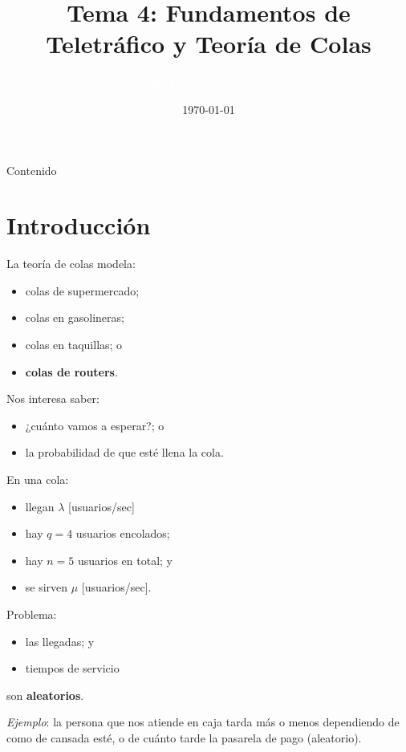 \documentclass[xcolor={x11names}]{beamer}
\title[Tema 4]{Tema 4: Fundamentos de Teletráfico y Teoría de Colas}
\author{\textcolor{white}{RSTC curso 2022-2023}}
\date{\today}
\begin{document}
\frame{\titlepage }


\begin{frame}[allowframebreaks]{Contenido}
    \tableofcontents
\end{frame}




\section{Introducción}
\begin{frame}{\secname}
    La teoría de colas modela:
    \begin{itemize}
        \item colas de supermercado;
        \item colas en gasolineras;
        \item colas en taquillas; o
        \item \textbf{colas de routers}.
    \end{itemize}

    \vfill
    Nos interesa saber:
    \begin{itemize}
        \item ¿cuánto vamos a esperar?; o
        \item la probabilidad de que esté llena la cola.
    \end{itemize}
\end{frame}



\begin{frame}{\secname}
    \begin{figure}
        
    \end{figure}

    En una cola:
    \begin{itemize}
        \item llegan $\lambda$ [usuarios/sec]
        \item hay $q=4$ usuarios encolados;
        \item hay $n=5$ usuarios en total; y
        \item se sirven $\mu$ [usuarios/sec].
    \end{itemize}
\end{frame}


\begin{frame}{\secname}
    Problema:
    \begin{itemize}
        \item las llegadas; y
        \item tiempos de servicio
    \end{itemize}
    son \textbf{aleatorios}.

    \vfill

    \textit{Ejemplo}: la persona que nos
    atiende en caja tarda más o menos
    dependiendo de como de cansada esté,
    o de cuánto tarde la pasarela de pago
    (aleatorio).
\end{frame}
\end{document}
